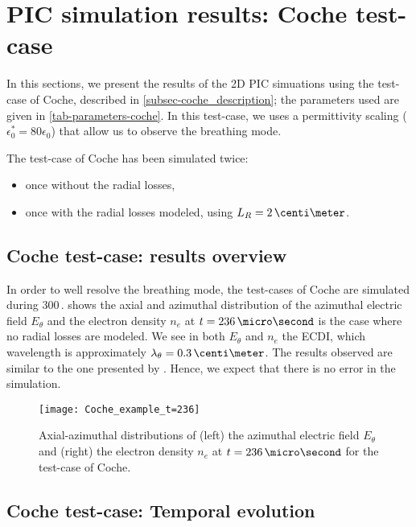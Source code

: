 
\section{PIC simulation results: Coche test-case}

In this sections, we present the results of the \ac{2D} \ac{PIC} simuations using the test-case of Coche, described in \cref{subsec-coche_description}; the parameters used are given in \vref{tab-parameters-coche}.
In this test-case, we uses a permittivity scaling ($\epsilon_0^* = 80 \epsilon_0$) that allow us to observe the breathing mode.

The test-case of Coche has been simulated twice\string:
\begin{itemize}
  \item once without the radial losses, 
  \item once with the radial losses modeled, using $L_R = 2\,\centi\meter$.
\end{itemize}
 

\subsection{Coche test-case: results overview} \label{subsec-choche-overview}

In order to well resolve the breathing mode, the test-cases of Coche are simulated during 300\,\micro\second.
 shows the axial and azimuthal distribution of the azimuthal electric field $E_{\theta}$ and the electron density $n_e$ at $t=236\,\micro\second$ is the case where no radial losses are modeled.
We see in both $E_{\theta}$ and $n_e$ the \ac{ECDI}, which wavelength is approximately $\lambda_{\theta} = 0.3\,\centi\meter$.
The results observed are similar to the one presented by \citet{coche2014}.
Hence, we expect that there is no error in the simulation.

\begin{figure}[hbt]
  \centering
  \texttt{[image: Coche\_example\_t=236]}
  \caption{ Axial-azimuthal distributions of (left) the azimuthal electric field $E_{\theta}$ and (right) the electron density $n_e$ at $t=236\,\micro\second$ for the test-case of Coche. } 
  \label{fig-overview_coche_neEx}
\end{figure}



\subsection{Coche test-case: Temporal evolution} \label{subsec-temp_coche}

